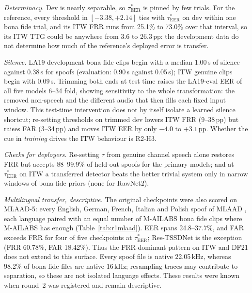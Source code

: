 \documentclass[review,authoryear]{elsarticle}
\newcommand{\tauE}{\tau^{*}_{\mathrm{EER}}}
\begin{document}
\emph{Determinacy.} Dev is nearly separable, so \(\tauE\) is pinned by few trials. For the reference, every threshold in
\([-3.38, +2.14]\) ties with \(\tauE\) on dev within one bona fide trial, and its ITW FRR runs from 25.1\% to 73.0\% over
that interval, so its ITW TTG could be anywhere from 3.6 to 26.3\,pp: the development data do not determine how much of
the reference's deployed error is transfer.

\emph{Silence.} LA19 development bona fide clips begin with a median 1.00\,s of silence against 0.38\,s for spoofs
(evaluation: 0.90\,s against 0.05\,s); ITW genuine clips begin with 0.09\,s. Trimming both ends at test time raises the LA19-eval EER of all five models 6--34 fold, showing sensitivity to
the whole transformation: the removed non-speech and the different audio that then fills each fixed input window. This
test-time intervention does not by itself isolate a learned silence shortcut; re-setting thresholds on trimmed dev lowers ITW FRR (9--38\,pp) but raises FAR (3--34\,pp) and moves ITW EER by
only \(-4.0\) to \(+3.1\)\,pp. Whether the cue in \emph{training} drives the ITW behaviour is R2-H3.

\emph{Checks for deployers.} Re-setting \(\tau\) from genuine channel speech alone restores FRR but accepts 88--99.9\% of
held-out spoofs for the primary models; and at \(\tauE\) on ITW a transferred detector beats the better trivial system only
in narrow windows of bona fide priors (none for RawNet2).

\emph{Multilingual transfer, descriptive.} The original checkpoints were also scored on MLAAD-5: every English, German,
French, Italian and Polish spoof of MLAAD \citep{mlaad24}, each language paired with an equal number of M-AILABS bona fide
clips where M-AILABS has enough \citep{solak17_mailabs} (Table~\ref{tab:r1mlaad}). EER spans 24.8--37.7\%, and FAR exceeds FRR for four of five checkpoints at
\(\tauE\); Res-TSSDNet is the exception (FRR 60.78\%, FAR 18.42\%). Thus the FRR-dominant pattern on ITW and DF21 does
not extend to this surface. Every spoof file is native 22.05\,kHz, whereas 98.2\% of bona fide files are native
16\,kHz; resampling traces may contribute to separation, so these are not isolated language effects. These results
were known when round~2 was registered and remain descriptive.
\end{document}
